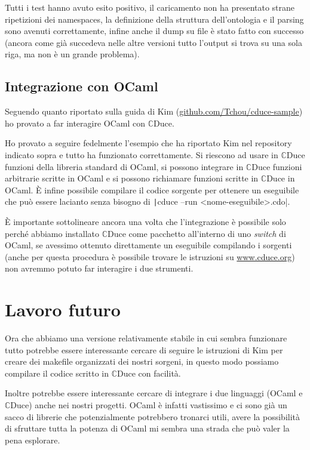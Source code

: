 \documentclass[]{article}
\newcommand{\cduce}{$\mathbb {C}$Duce\xspace}
\begin{document}
Tutti i test hanno avuto esito positivo, il caricamento non ha presentato strane ripetizioni dei namespaces, la definizione della struttura dell'ontologia e il parsing sono avenuti correttamente, infine anche il dump su file è stato fatto con successo (ancora come già succedeva nelle altre versioni tutto l'output si trova su una sola riga, ma non è un grande problema).

\subsection{Integrazione con OCaml}
Seguendo quanto riportato sulla guida di Kim (\href{https://github.com/Tchou/cduce-sample}{github.com/Tchou/cduce-sample}) ho provato a far interagire OCaml con \cduce. 

Ho provato a seguire fedelmente l'esempio che ha riportato Kim nel repository indicato sopra e tutto ha funzionato correttamente. Si riescono ad usare in \cduce funzioni della libreria standard di OCaml, si possono integrare in \cduce funzioni arbitrarie scritte in OCaml e si possono richiamare funzioni scritte in \cduce in OCaml. È infine possibile compilare  il codice sorgente per ottenere un eseguibile che può essere lacianto senza bisogno di \texttt|cduce --run <nome-eseguibile>.cdo|.

 È importante sottolineare ancora una volta che l'integrazione è possibile solo perché abbiamo installato \cduce come pacchetto all'interno di uno \textit{switch} di OCaml, se avessimo ottenuto direttamente un eseguibile compilando i sorgenti (anche per questa procedura è possibile trovare le istruzioni su \href{https://www.cduce.org/}{www.cduce.org}) non avremmo potuto far interagire i due strumenti.

\section{Lavoro futuro}
Ora che abbiamo una versione relativamente stabile in cui sembra funzionare tutto potrebbe essere interessante cercare di seguire le istruzioni di Kim per creare dei makefile organizzati dei nostri sorgeni, in questo modo possiamo compilare il codice scritto in \cduce con facilità.

Inoltre potrebbe essere interessante cercare di integrare i due linguaggi (OCaml e \cduce) anche nei nostri progetti. OCaml è infatti vastissimo e ci sono già un sacco di librerie che potenzialmente potrebbero tronarci utili, avere la possibilità di sfruttare tutta la potenza di OCaml mi sembra una strada che può valer la pena esplorare.
\end{document}
